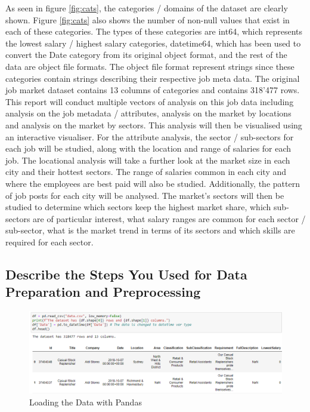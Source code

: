 \documentclass[twoside, 12pt, a4paper]{article}
\begin{document}
As seen in figure \ref{fig:cats}, the categories / domains of the dataset are clearly shown. Figure \ref{fig:cats} also shows the number of non-null values that exist in each of these categories. The types of these categories are int64, which represents the lowest salary / highest salary categories, datetime64, which has been used to convert the Date category from its original object format, and the rest of the data are object file formats. The object file format represent strings since these categories contain strings describing their respective job meta data. The original job market dataset contains 13 columns of categories and contains 318'477 rows.\\
This report will conduct multiple vectors of analysis on this job data including analysis on the job metadata / attributes, analysis on the market by locations and analysis on the market by sectors. This analysis will then be visualised using an interactive visualiser. For the attribute analysis, the sector / sub-sectors for each job will be studied, along with the location and range of salaries for each job. The locational analysis will take a further look at the market size in each city and their hottest sectors. The range of salaries common in each city and where the employees are best paid will also be studied. Additionally, the pattern of job posts for each city will be analysed. The market's sectors will then be studied to determine which sectors keep the highest market share, which sub-sectors are of particular interest, what salary ranges are common for each sector / sub-sector, what is the market trend in terms of its sectors and which skills are required for each sector. 

\newpage
\subsection{Describe the Steps You Used for Data Preparation and Preprocessing}

\begin{figure}[h]
	\centering
	\includegraphics[scale = 0.56]{LoadingDataCode.png}
	\caption{Loading the Data with Pandas}
	\label{fig:LoadingData}
\end{figure}
\end{document}
